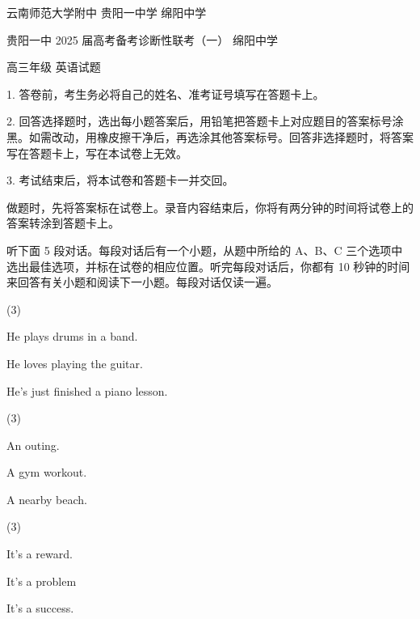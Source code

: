 \documentclass{英语试卷}
\begin{document}
\par 云南师范大学附中 贵阳一中学 绵阳中学\par
\par 贵阳一中 2025 届高考备考诊断性联考（一） 绵阳中学\par
\par 高三年级 英语试题\par
\begin{notice}
\par 1. 答卷前，考生务必将自己的姓名、准考证号填写在答题卡上。\par
\par 2. 回答选择题时，选出每小题答案后，用铅笔把答题卡上对应题目的答案标号涂黑。如需改动，用橡皮擦干净后，再选涂其他答案标号。回答非选择题时，将答案写在答题卡上，写在本试卷上无效。\par
\par 3. 考试结束后，将本试卷和答题卡一并交回。\par
\end{notice}
\par 做题时，先将答案标在试卷上。录音内容结束后，你将有两分钟的时间将试卷上的答案转涂到答题卡上。\par
{}
\par 听下面 5 段对话。每段对话后有一个小题，从题中所给的 A、B、C 三个选项中选出最佳选项，并标在试卷的相应位置。听完每段对话后，你都有 10 秒钟的时间来回答有关小题和阅读下一小题。每段对话仅读一遍。\par
{}
\begin{choices}(3)
  \item He plays drums in a band.
  \item He loves playing the guitar.
  \item He's just finished a piano lesson.
\end{choices}
\begin{choices}(3)
  \item An outing.
  \item A gym workout.
  \item A nearby beach.
\end{choices}
\begin{choices}(3)
  \item It's a reward.
  \item It's a problem
  \item It's a success.
\end{choices}
\end{document}
